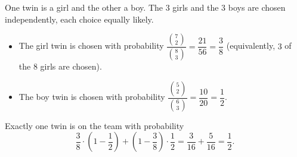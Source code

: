 One twin is a girl and the other a boy. The $3$ girls and the $3$ boys are chosen independently, each choice equally likely.
\begin{itemize}
\item The girl twin is chosen with probability $\dfrac{\binom72}{\binom83}=\dfrac{21}{56}=\dfrac{3}{8}$ (equivalently, $3$ of the $8$ girls are chosen).
\item The boy twin is chosen with probability $\dfrac{\binom52}{\binom63}=\dfrac{10}{20}=\dfrac{1}{2}$.
\end{itemize}
Exactly one twin is on the team with probability
\[
\dfrac{3}{8}\cdot\left(1-\dfrac{1}{2}\right)+\left(1-\dfrac{3}{8}\right)\cdot\dfrac{1}{2}=\dfrac{3}{16}+\dfrac{5}{16}=\boxed{\dfrac{1}{2}}.
\]
